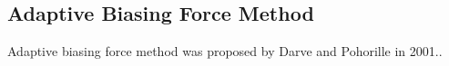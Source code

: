 \subsection{Adaptive Biasing Force Method\label{Sec:ES:ABF}}
Adaptive biasing force method was proposed by Darve and Pohorille in 2001.\cite{DarveJCP2001}.